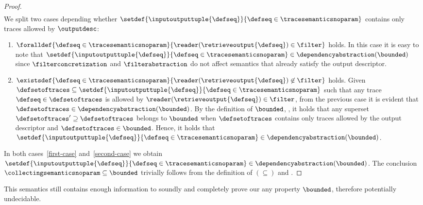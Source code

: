 \begin{theorem}
\begin{proof}
\begin{align}
    \end{align}
    We split two cases depending whether $\setdef{\inputoutputtuple{\defseq}}{\defseq\in\tracesemanticsnoparam}$ contains only traces allowed by $\outputdesc$:
    \begin{enumerate}[label=(\roman*)]
      \item $\foralldef{\defseq\in\tracesemanticsnoparam}{\reader(\retrieveoutput{\defseq})\in\filter}$ holds. In this case it is easy to note that $\setdef{\inputoutputtuple{\defseq}}{\defseq\in\tracesemanticsnoparam} \in \dependencyabstraction(\bounded)$ since $\filterconcretization$ and $\filterabstraction$ do not affect semantics that already satisfy the output descriptor. \label{first-case}
      \item $\existsdef{\defseq\in\tracesemanticsnoparam}{\reader(\retrieveoutput{\defseq})\not\in\filter}$ holds. Given $\defsetoftraces\subseteq\setdef{\inputoutputtuple{\defseq}}{\defseq\in\tracesemanticsnoparam}$ such that any trace $\defseq\in\defsetoftraces$ is allowed by $\reader(\retrieveoutput{\defseq})\in\filter$, from the previous case it is evident that $\defsetoftraces\in\dependencyabstraction(\bounded)$. By the definition of $\bounded$, , it holds that any superset $\defsetoftraces'\supseteq\defsetoftraces$ belongs to $\bounded$ when $\defsetoftraces$ contains only traces allowed by the output descriptor and $\defsetoftraces\in\bounded$. Hence, it holds that $\setdef{\inputoutputtuple{\defseq}}{\defseq\in\tracesemanticsnoparam} \in \dependencyabstraction(\bounded)$. \label{second-case}
    \end{enumerate}
    In both cases~\ref{first-case} and~\ref{second-case} we obtain $\setdef{\inputoutputtuple{\defseq}}{\defseq\in\tracesemanticsnoparam} \in \dependencyabstraction(\bounded)$.
    The conclusion $\collectingsemanticsnoparam \subseteq \bounded$ trivially follows from the definition of $(\subseteq)$ and .
  \end{proof}
\end{theorem}

This semantics still contains enough information to soundly and completely prove our any property $\bounded$, therefore potentially undecidable.
